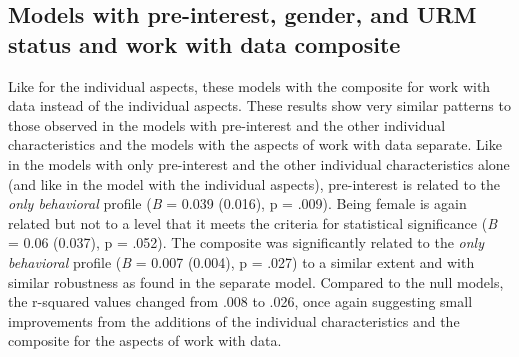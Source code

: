 \documentclass[]{msu-thesis}
\theoremstyle{definition}
\theoremstyle{definition}
\theoremstyle{definition}
\theoremstyle{remark}
\begin{document}
\subsection{Models with pre-interest, gender, and URM status and work
with data
composite}\label{models-with-pre-interest-gender-and-urm-status-and-work-with-data-composite}

Like for the individual aspects, these models with the composite for
work with data instead of the individual aspects. These results show
very similar patterns to those observed in the models with pre-interest
and the other individual characteristics and the models with the aspects
of work with data separate. Like in the models with only pre-interest
and the other individual characteristics alone (and like in the model
with the individual aspects), pre-interest is related to the \emph{only
behavioral} profile (\emph{B} = 0.039 (0.016), p = .009). Being female
is again related but not to a level that it meets the criteria for
statistical significance (\emph{B} = 0.06 (0.037), p = .052). The
composite was significantly related to the \emph{only behavioral}
profile (\emph{B} = 0.007 (0.004), p = .027) to a similar extent and
with similar robustness as found in the separate model. Compared to the
null models, the r-squared values changed from .008 to .026, once again
suggesting small improvements from the additions of the individual
characteristics and the composite for the aspects of work with data.
\end{document}
